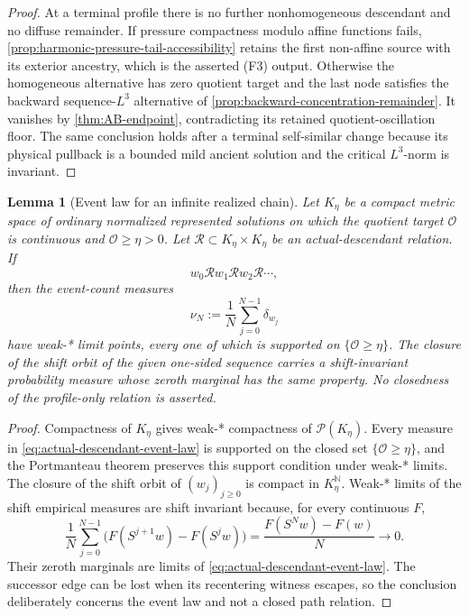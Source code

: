 \documentclass[11pt]{amsart}
\numberwithin{equation}{section}
\theoremstyle{plain}
\newtheorem{lemma}[lemma]{Lemma}
\theoremstyle{definition}
\theoremstyle{remark}
\begin{document}
\begin{proof}
At a terminal profile there is no further nonhomogeneous descendant and no
diffuse remainder.  If pressure compactness modulo affine functions fails,
\cref{prop:harmonic-pressure-tail-accessibility} retains the first non-affine
source with its exterior ancestry, which is the asserted \textup{(F3)}
output.  Otherwise the homogeneous alternative has zero quotient target and
the last node satisfies the backward sequence-\(L^3\) alternative of
\cref{prop:backward-concentration-remainder}.  It vanishes by
\cref{thm:AB-endpoint}, contradicting its retained quotient-oscillation floor.
The same conclusion holds after a terminal self-similar change because its
physical pullback is a bounded mild ancient solution and the critical
\(L^3\)-norm is invariant.
\end{proof}

\begin{lemma}[Event law for an infinite realized chain]
\label{lem:compact-descendant-path-law}
Let \(K_\eta\) be a compact metric space of ordinary normalized represented
solutions on which the quotient target \(\mathcal O\) is continuous and
\(\mathcal O\ge\eta>0\).  Let
\(\mathcal R\subset K_\eta\times K_\eta\) be an actual-descendant
relation.  If
\begin{equation}\label{eq:actual-infinite-descendant-chain}
 w_0\mathcal Rw_1\mathcal Rw_2\mathcal R\cdots,
\end{equation}
then the event-count measures
\begin{equation}\label{eq:actual-descendant-event-law}
 \nu_N:=\frac1N\sum_{j=0}^{N-1}\delta_{w_j}
\end{equation}
have weak-* limit points, every one of which is supported on
\(\{\mathcal O\ge\eta\}\).  The closure of the shift orbit of the given
one-sided sequence carries a shift-invariant probability measure whose zeroth
marginal has the same property.  No closedness of the profile-only relation is
asserted.
\end{lemma}

\begin{proof}
Compactness of \(K_\eta\) gives weak-* compactness of
\(\mathcal P(K_\eta)\).  Every measure in
\eqref{eq:actual-descendant-event-law} is supported on the closed set
\(\{\mathcal O\ge\eta\}\), and the Portmanteau theorem preserves this support
condition under weak-* limits.  The closure of the shift orbit of
\((w_j)_{j\ge0}\) is compact in \(K_\eta^{\mathbb N}\).  Weak-* limits of the
shift empirical measures are shift invariant because, for every continuous
\(F\),
\[
 \frac1N\sum_{j=0}^{N-1}
 \bigl(F(S^{j+1}w)-F(S^jw)\bigr)
 =\frac{F(S^Nw)-F(w)}N\longrightarrow0.
\]
Their zeroth marginals are limits of
\eqref{eq:actual-descendant-event-law}.  The successor edge can be lost when
its recentering witness escapes, so the conclusion deliberately concerns the
event law and not a closed path relation.
\end{proof}
\end{document}
